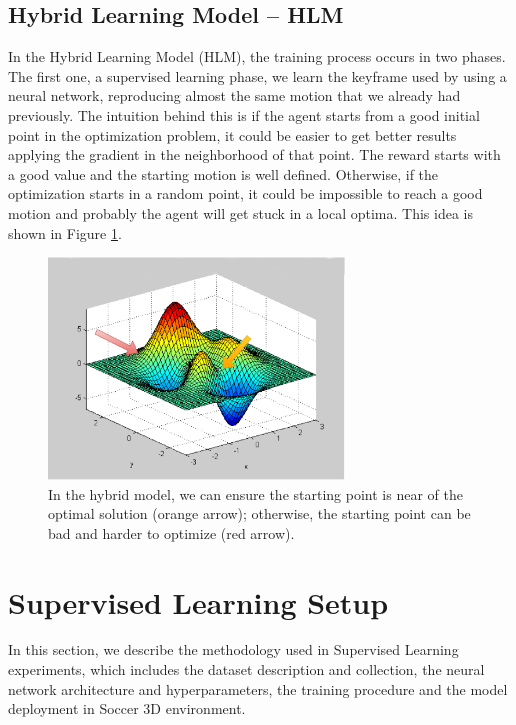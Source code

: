 \subsection{Hybrid Learning Model -- HLM}
In the Hybrid Learning Model (HLM), the training process occurs in two phases. The first one, a supervised learning phase, we learn the keyframe used by using a neural network, reproducing almost the same motion that we already had previously. The intuition behind this is if the agent starts from a good initial point in the optimization problem, it could be easier to get better results applying the gradient in the neighborhood of that point. The reward starts with a good value and the starting motion is well defined. Otherwise, if the optimization starts in a random point, it could be impossible to reach a good motion and probably the agent will get stuck in a local optima. This idea is shown in Figure \ref{optimization_intuition}.

\begin{figure}[!htbp]
	\centering
	\includegraphics[width=0.7\textwidth]{Cap5/optimization_final.eps}
	\caption{In the hybrid model, we can ensure the starting point is near of the optimal solution (orange arrow); otherwise, the starting point can be bad and harder to optimize (red arrow).}
	\label{optimization_intuition}
\end{figure}


\section{Supervised Learning Setup}\label{supervised_learning_setup}

In this section, we describe the methodology used in Supervised Learning experiments, which includes the dataset description and collection, the neural network architecture and hyperparameters, the training procedure and the model deployment in Soccer 3D environment.

